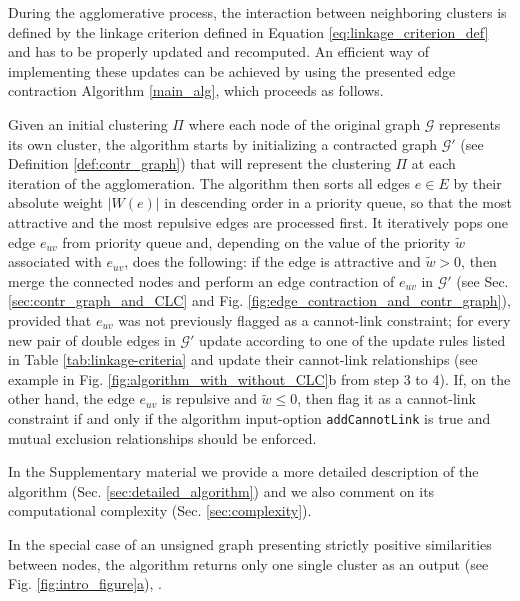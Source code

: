 During the agglomerative process, the interaction between neighboring clusters is defined by the linkage criterion defined in Equation \ref{eq:linkage_criterion_def} and has to be properly updated and recomputed. 
An efficient way of implementing these updates can be achieved by using the presented edge contraction Algorithm \ref{main_alg}, which proceeds as follows.

Given an initial clustering $\Pi$ where each node of the original graph $\mathcal{G}$ represents its own cluster, the algorithm starts by initializing a contracted graph $\mathcal{G}'$ (see Definition \ref{def:contr_graph}) that will represent the clustering $\Pi$ at each iteration of the agglomeration. The algorithm then sorts all edges $e\in E$ by their absolute weight $|W(e)|$ in descending order in a priority queue, so that the most attractive and the most repulsive edges are processed first. It iteratively pops one edge $e_{uv}$ from priority queue and, depending on the value of the priority $\tilde{w}$ associated with $e_{uv}$, does the following: if the edge is attractive and $\tilde{w}>0$, then merge the connected nodes and perform an edge contraction of $e_{uv}$ in $\mathcal{G}'$ (see Sec. \ref{sec:contr_graph_and_CLC} and Fig. \ref{fig:edge_contraction_and_contr_graph}), provided that $e_{uv}$ was not previously flagged as a cannot-link constraint; for every new pair of double edges in $\mathcal{G}'$ update  according to one of the update rules listed in Table \ref{tab:linkage-criteria} and update their cannot-link relationships (see example in Fig. \ref{fig:algorithm_with_without_CLC}b from step 3 to 4). If, on the other hand, the edge $e_{uv}$ is repulsive and $\tilde{w}\leq 0$, then flag it as a cannot-link constraint if and only if the algorithm input-option \texttt{addCannotLink} is true and mutual exclusion relationships should be enforced.

In the Supplementary material we provide a more detailed description of the algorithm (Sec. \ref{sec:detailed_algorithm}) and we also comment on its computational complexity (Sec. \ref{sec:complexity}).

 In the special case of an unsigned graph %
 presenting strictly positive similarities between nodes, the algorithm returns only one single cluster as an output (see Fig. \hyperref[fig:intro_figure]{\ref*{fig:intro_figure}a}),  .


